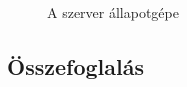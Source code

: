 \begin{figure}[htbp]
\center
{}
\caption{A szerver állapotgépe}
\label{fig:server_statemachine_full}
\end{figure}

\subsection{Összefoglalás}

